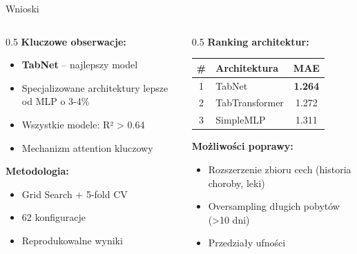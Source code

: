 \documentclass[aspectratio=169,12pt]{beamer}
\begin{document}
\begin{frame}{Wnioski}
    \begin{columns}[T]
        \begin{column}{0.5\textwidth}
            \textbf{Kluczowe obserwacje:}
            \begin{itemize}
                \item \textbf{TabNet} -- najlepszy model
                \item Specjalizowane architektury lepsze od MLP o 3-4\%
                \item Wszystkie modele: R² > 0.64
                \item Mechanizm attention kluczowy
            \end{itemize}

            \vspace{0.3cm}
            \textbf{Metodologia:}
            \begin{itemize}
                \item Grid Search + 5-fold CV
                \item 62 konfiguracje
                \item Reprodukowalne wyniki
            \end{itemize}
        \end{column}
        \begin{column}{0.5\textwidth}
            \textbf{Ranking architektur:}
            \vspace{0.2cm}

            \small
            \begin{tabular}{clc}
                \toprule
                \#                    & Architektura               & MAE                                \\
                \midrule
                \cellcolor{green!20}1 & \cellcolor{green!20}TabNet & \cellcolor{green!20}\textbf{1.264} \\
                2                     & TabTransformer             & 1.272                              \\
                3                     & SimpleMLP                  & 1.311                              \\
                \bottomrule
            \end{tabular}

            \vspace{0.5cm}
            \textbf{Możliwości poprawy:}
            \begin{itemize}
                \setlength{\itemsep}{0pt}
                \setlength{\parskip}{0pt}
                \item Rozszerzenie zbioru cech (historia choroby, leki)
                \item Oversampling długich pobytów (>10 dni)
                \item Przedziały ufności
            \end{itemize}
        \end{column}
    \end{columns}
\end{frame}
\end{document}
